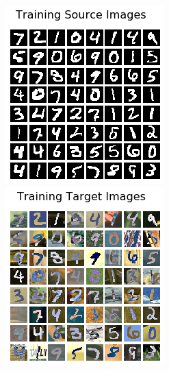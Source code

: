 \documentclass{article}
\begin{document}
\begin{figure}
\begin{minipage}[t]{0.5\textwidth}
    \centering
    \begin{minipage}[t]{0.48\textwidth}
      \includegraphics[width=\linewidth]{DSN/source.png}
    \end{minipage}
    \hfill
    \begin{minipage}[t]{0.48\textwidth}
      \includegraphics[width=\linewidth]{DSN/target.png}

\end{minipage}
\end{minipage}
\end{figure}
\end{document}

